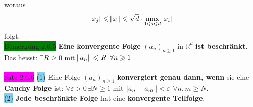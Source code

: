 \documentclass[landscape, 10pt]{article}
\newcommand{\R}{\mathbb{R}}
\begin{document}
\begin{multicols}{3}
                     woraus 
                     \begin{equation*}
                            |x_j|\leqslant \norm{x}\leqslant
                            \sqrt{d}\cdot\max
                            \limits_{1\leqslant i\leqslant d}|x_i|
                     \end{equation*}
                     folgt.\\
              \colorbox{green}{Bemerkung 2.6.5} \textbf{Eine konvergente Folge} $(a_n)_{n\geqslant1}$ in 
                     $\R^d$ \textbf{ist beschränkt}. Das heisst: 
                     \textcolor{NavyBlue}{$\exists R\geqslant0$} mit 
                     \textcolor{NavyBlue}{
                     $\norm{a_n}\leqslant R\enspace\forall n\geqslant1$}\\
              \\
              \colorbox{magenta}{Satz 2.6.6} 
                     \colorbox{SkyBlue}{(1)} 
                            Eine Folge $(a_n)_{n\geqslant1}$ 
                            \textbf{konvergiert genau dann, wenn} sie eine 
                            \textbf{Cauchy Folge} ist: 
                            \textcolor{NavyBlue}{
                            $\forall\varepsilon >0\,\exists N\geqslant1$} mit 
                            \textcolor{NavyBlue}{
                            $\norm{a_n-a_m}<\varepsilon$
                            \quad$\forall n,m\geqslant N$}.\\
                     \colorbox{SkyBlue}{(2)} 
                            \textbf{Jede beschränkte Folge} hat eine 
                            \textbf{konvergente Teilfolge}.\\

\end{multicols}
\end{document}
